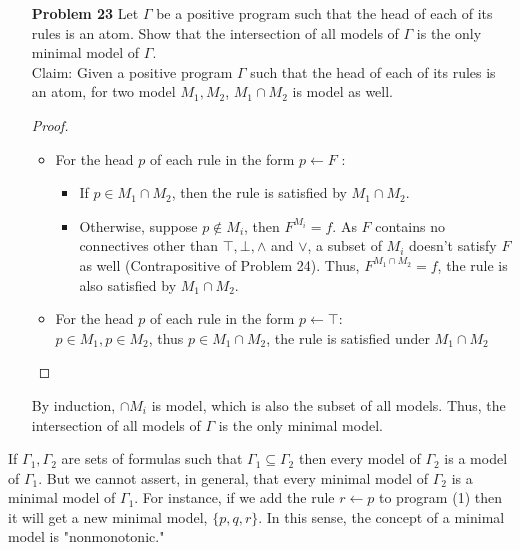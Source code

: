 \begin{enumerate}
\item[\textbf{Problem 23}] Let $\Gamma$ be a positive program such that the head of each of its rules is an atom. Show that the intersection of all models of $\Gamma$ is the only minimal model of $\Gamma$. \\
Claim: Given a positive program $\Gamma$ such that the head of each of its rules is an atom, for two model $M_1, M_2$, $M_1 \cap M_2$ is model as well.  
\begin{proof} $~$
\begin{itemize}
\item For the head $p$ of each rule in the form $p \leftarrow F$ :
\begin{itemize}
\item If $p \in M_1 \cap M_2$, then the rule is satisfied by $M_1 \cap M_2$. 
\item Otherwise, suppose $p \not \in M_i$, then $F^{M_i} = f$. As $F$ contains no connectives other than $\top, \bot, \wedge$ and $\vee$, a subset of $M_i$ doesn't satisfy $F$ as well (Contrapositive of Problem 24). Thus, $F^{M_1 \cap M_2} = f$, the rule is also satisfied by $M_1 \cap M_2$. 
\end{itemize}
\item For the head $p$ of each rule in the form $p \leftarrow \top$:  \\
$p \in M_1, p \in M_2$, thus $p \in M_1 \cap M_2$, the rule is satisfied under $M_1 \cap M_2$
\end{itemize}
\end{proof}
By induction, $\cap M_i$ is model, which is also the subset of all models. Thus, the intersection of all models of $\Gamma$ is the only minimal model. 


\end{enumerate}



\noindent If $\Gamma_1, \Gamma_2$ are sets of formulas such that $\Gamma_1 \subseteq \Gamma_2$ then every model of $\Gamma_2$ is a model of $\Gamma_1$. But we cannot assert, in general, that every minimal model of $\Gamma_2$ is a minimal model of $\Gamma_1$. For instance, if we add the rule $r \leftarrow p$ to program (1) then it will get a new minimal model, $\{p, q, r\}$. In this sense, the concept of a minimal model is "nonmonotonic."

